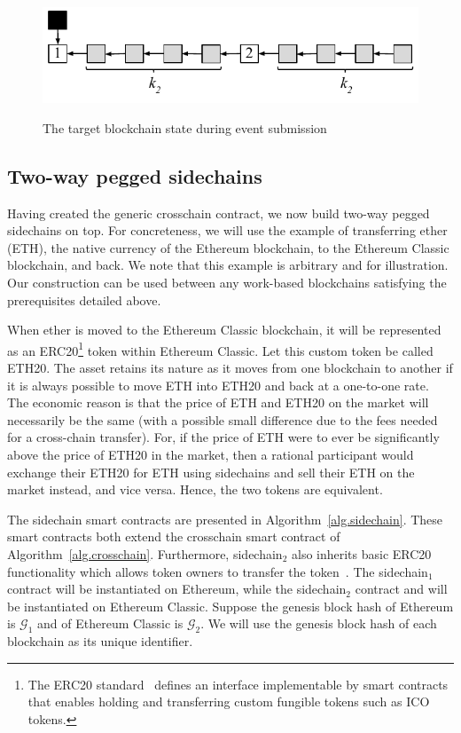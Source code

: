 \begin{figure}
    \caption{The target blockchain state during event submission}
    \centering
    \includegraphics[width=0.6 \columnwidth,keepaspectratio]{figures/contestation.pdf}
    \label{fig.contestation}
\end{figure}

\subsection*{Two-way pegged sidechains}
Having created the generic crosschain contract, we now build two-way pegged
sidechains on top. For concreteness, we will use the example of
transferring ether (ETH), the native currency of the Ethereum blockchain, to the
Ethereum Classic blockchain, and back. We note that this example is arbitrary
and for illustration. Our construction can be used between any work-based
blockchains satisfying the prerequisites detailed above.

When ether is moved to the Ethereum Classic blockchain, it will be represented
as an ERC20\footnote{The ERC20 standard~\cite{erc20} defines an interface
implementable by smart contracts that enables holding and transferring custom
fungible tokens such as ICO tokens.} token within Ethereum Classic. Let this
custom token be called ETH20. The asset retains its nature as it moves from one
blockchain to another if it is always possible to move ETH into ETH20 and back
at a one-to-one rate. The economic reason is that the price of ETH and ETH20 on
the market will necessarily be the same (with a possible small difference due to
the fees needed for a cross-chain transfer). For, if the price of ETH were to
ever be significantly above the price of ETH20 in the market, then a rational
participant would exchange their ETH20 for ETH using sidechains and sell their
ETH on the market instead, and vice versa. Hence, the two tokens are equivalent.

The sidechain smart contracts are presented in Algorithm~\ref{alg.sidechain}.
These smart contracts both extend the \textsf{crosschain} smart contract of
Algorithm~\ref{alg.crosschain}. Furthermore, \textsf{sidechain}$_2$ also
inherits basic \textsf{ERC20} functionality which allows token owners to
transfer the token~\cite{openzeppelin-erc20}. The \textsf{sidechain}$_1$
contract will be instantiated on Ethereum, while the \textsf{sidechain}$_2$
contract and will be instantiated on Ethereum Classic. Suppose the genesis block
hash of Ethereum is $\mathcal{G}_1$ and of Ethereum Classic is $\mathcal{G}_2$.
We will use the genesis block hash of each blockchain as its unique identifier.

